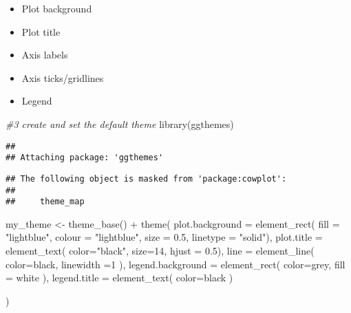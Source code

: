 \documentclass[
]{article}
\newenvironment{Shaded}{\begin{snugshade}}{\end{snugshade}}
\newcommand{\AttributeTok}[1]{\textcolor[rgb]{0.77,0.63,0.00}{#1}}
\newcommand{\CommentTok}[1]{\textcolor[rgb]{0.56,0.35,0.01}{\textit{#1}}}
\newcommand{\DecValTok}[1]{\textcolor[rgb]{0.00,0.00,0.81}{#1}}
\newcommand{\FloatTok}[1]{\textcolor[rgb]{0.00,0.00,0.81}{#1}}
\newcommand{\FunctionTok}[1]{\textcolor[rgb]{0.00,0.00,0.00}{#1}}
\newcommand{\NormalTok}[1]{#1}
\newcommand{\OtherTok}[1]{\textcolor[rgb]{0.56,0.35,0.01}{#1}}
\newcommand{\SpecialCharTok}[1]{\textcolor[rgb]{0.00,0.00,0.00}{#1}}
\newcommand{\StringTok}[1]{\textcolor[rgb]{0.31,0.60,0.02}{#1}}
\providecommand{\tightlist}{%
  \setlength{\itemsep}{0pt}\setlength{\parskip}{0pt}}
\begin{document}
\begin{itemize}
\tightlist
\item
  Plot background
\item
  Plot title
\item
  Axis labels
\item
  Axis ticks/gridlines
\item
  Legend
\end{itemize}

\begin{Shaded}
\begin{Highlighting}[]
\CommentTok{\#3 create and set the default theme}
\FunctionTok{library}\NormalTok{(ggthemes)}
\end{Highlighting}
\end{Shaded}

\begin{verbatim}
## 
## Attaching package: 'ggthemes'
\end{verbatim}

\begin{verbatim}
## The following object is masked from 'package:cowplot':
## 
##     theme_map
\end{verbatim}

\begin{Shaded}
\begin{Highlighting}[]
\NormalTok{my\_theme }\OtherTok{\textless{}{-}} \FunctionTok{theme\_base}\NormalTok{() }\SpecialCharTok{+} 
  \FunctionTok{theme}\NormalTok{(}
    \AttributeTok{plot.background =} \FunctionTok{element\_rect}\NormalTok{(}
      \AttributeTok{fill =} \StringTok{"lightblue"}\NormalTok{,}
      \AttributeTok{colour =} \StringTok{"lightblue"}\NormalTok{,}
      \AttributeTok{size =} \FloatTok{0.5}\NormalTok{, }\AttributeTok{linetype =} \StringTok{"solid"}\NormalTok{),}
    \AttributeTok{plot.title =} \FunctionTok{element\_text}\NormalTok{(}
      \AttributeTok{color=}\StringTok{"black"}\NormalTok{, }
      \AttributeTok{size=}\DecValTok{14}\NormalTok{,}
      \AttributeTok{hjust =} \FloatTok{0.5}\NormalTok{),}
    \AttributeTok{line =} \FunctionTok{element\_line}\NormalTok{(}
      \AttributeTok{color=}\StringTok{\textquotesingle{}black\textquotesingle{}}\NormalTok{,}
      \AttributeTok{linewidth =}\DecValTok{1}
\NormalTok{    ),}
    \AttributeTok{legend.background =} \FunctionTok{element\_rect}\NormalTok{(}
      \AttributeTok{color=}\StringTok{\textquotesingle{}grey\textquotesingle{}}\NormalTok{,}
      \AttributeTok{fill =} \StringTok{\textquotesingle{}white\textquotesingle{}}
\NormalTok{    ),}
    \AttributeTok{legend.title =} \FunctionTok{element\_text}\NormalTok{(}
      \AttributeTok{color=}\StringTok{\textquotesingle{}black\textquotesingle{}}
\NormalTok{    )}
    
\NormalTok{  )}
\end{Highlighting}
\end{Shaded}
\end{document}
